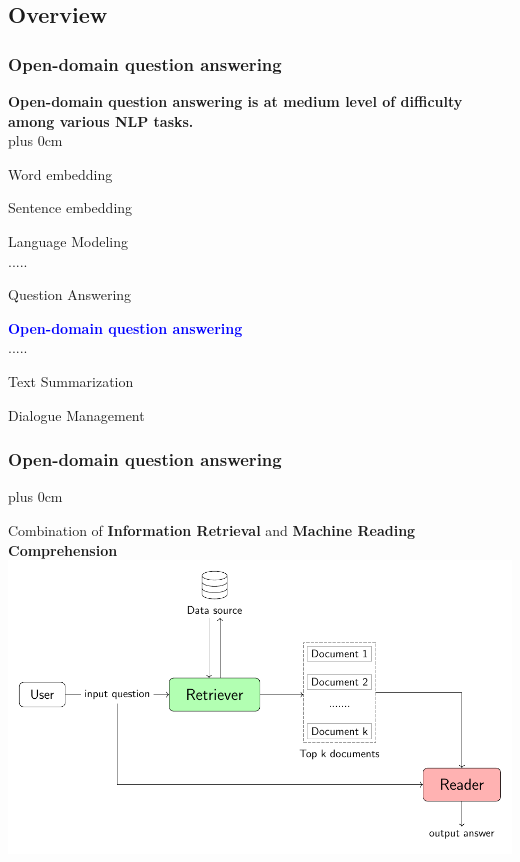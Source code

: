 \documentclass[11pt]{beamer}
\renewcommand{\raggedright}{\leftskip=0pt \rightskip=0pt plus 0cm}
\let\olditemize=\itemize
\renewenvironment{itemize}{\olditemize\raggedright}{\endlist}
\begin{document}
\subsection{Overview}
\begin{frame}
\frametitle{Open-domain question answering}
\textbf{Open-domain question answering is at medium level of difficulty among various NLP tasks.} \\[10pt]
\begin{itemize}
\item Word embedding
\item Sentence embedding
\item Language Modeling \\
.....
\item Question Answering
\item \textcolor{blue}{\bfseries Open-domain question answering}\\
.....
\item Text Summarization
\item Dialogue Management
\end{itemize}
\end{frame}
\begin{frame}
\frametitle{Open-domain question answering}
\begin{itemize}
	\item Combination of \textbf{Information Retrieval} and \textbf{Machine Reading Comprehension}
\end{itemize}
\hspace*{-15pt}
\includegraphics[scale=.68]{images/PDF/overall_arch/architecture.pdf}
\end{frame}
\end{document}
